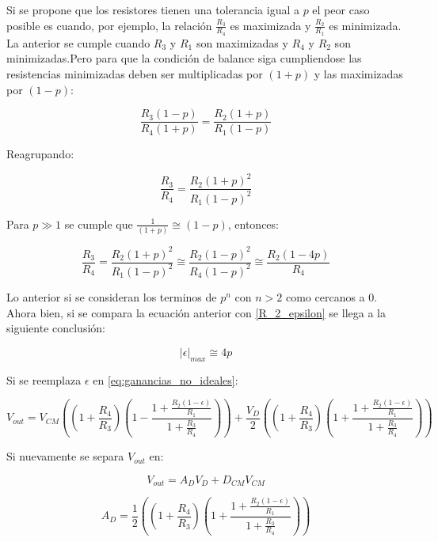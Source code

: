 \documentclass[a4paper]{article}
\begin{document}
Si se propone que los resistores tienen una tolerancia igual a $p$ el peor caso posible es cuando, por ejemplo, la relación $\frac{R_3}{R_4}$ es maximizada y $\frac{R_2}{R_1}$ es minimizada. La anterior se cumple cuando $R_3$ y $R_1$ son maximizadas y $R_4$ y $R_2$ son minimizadas.Pero para que la condición de balance siga cumpliendose las resistencias minimizadas deben ser multiplicadas por $(1 + p)$ y las maximizadas por $(1 - p)$:

\begin{equation}
\frac{R_3(1 - p)}{R_4(1 + p)} = \frac{R_2(1 + p)}{R_1(1 - p)}
\end{equation}

Reagrupando:

\begin{equation}
\frac{R_3}{R_4} = \frac{R_2(1 + p)^2}{R_1(1 - p)^2}
\end{equation}

Para $p \gg 1$ se cumple que  $\frac{1}{(1 + p)} \cong (1 - p)$, entonces:

\begin{equation}
\frac{R_3}{R_4} = \frac{R_2(1 + p)^2}{R_1(1 - p)^2} \cong	 \frac{R_2(1 - p)^2}{R_4(1 - p)^2} \cong \frac{R_2(1 - 4p)}{R_4}
\end{equation}

Lo anterior si se consideran los terminos de $p^n$ con $n > 2$ como cercanos a $0$. Ahora bien, si se compara la ecuación anterior con \ref{R_2_epsilon} se llega a la siguiente conclusión:

\begin{equation}
|\epsilon|_{max} \cong 4p
\end{equation}



Si se reemplaza $\epsilon$ en \ref{eq:ganancias_no_ideales}:

\begin{equation}
V_{out} = V_{CM}((1 + \frac{R_4}{R_3})(1 - \frac{1 + \frac{R_2(1 - \epsilon)}{R_1}}{1 + \frac{R_3}{R_4}})) + \frac{V_D}{2}((1 + \frac{R_4}{R_3})(1 + \frac{1 + \frac{R_2(1 - \epsilon)}{R_1}}{1 + \frac{R_3}{R_4}}))
\end{equation}

Si nuevamente se separa $V_{out}$ en:

\begin{equation}
V_{out} = A_DV_D + D_{CM}V_{CM}
\end{equation}

\begin{equation}
A_D = \frac{1}{2}((1 + \frac{R_4}{R_3})(1 + \frac{1 + \frac{R_2(1 - \epsilon)}{R_1}}{1 + \frac{R_3}{R_4}}))
\end{equation}
\end{document}
